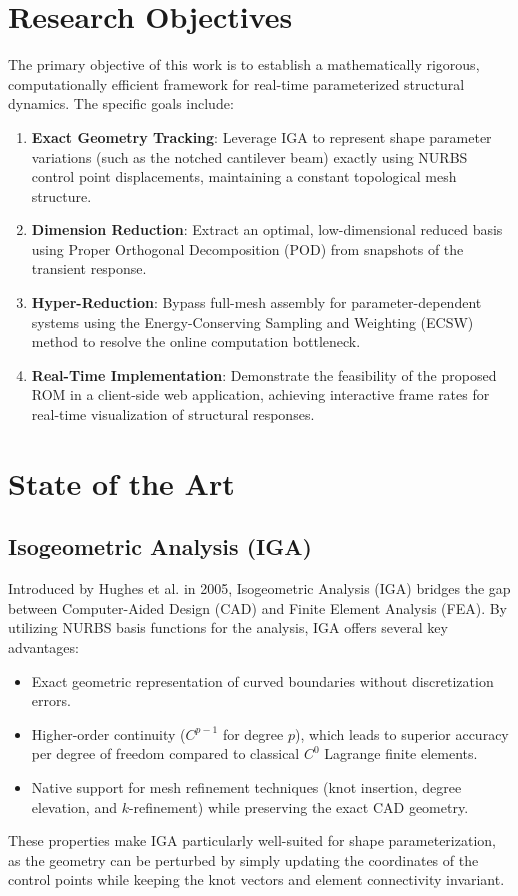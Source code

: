 \section{Research Objectives}
The primary objective of this work is to establish a mathematically rigorous, computationally efficient framework for real-time parameterized structural dynamics. The specific goals include:
\begin{enumerate}
    \item \textbf{Exact Geometry Tracking}: Leverage IGA to represent shape parameter variations (such as the notched cantilever beam) exactly using NURBS control point displacements, maintaining a constant topological mesh structure.
    \item \textbf{Dimension Reduction}: Extract an optimal, low-dimensional reduced basis using Proper Orthogonal Decomposition (POD) from snapshots of the transient response.
    \item \textbf{Hyper-Reduction}: Bypass full-mesh assembly for parameter-dependent systems using the Energy-Conserving Sampling and Weighting (ECSW) method to resolve the online computation bottleneck.
    \item \textbf{Real-Time Implementation}: Demonstrate the feasibility of the proposed ROM in a client-side web application, achieving interactive frame rates for real-time visualization of structural responses.
\end{enumerate}

\section{State of the Art}
\subsection{Isogeometric Analysis (IGA)}
Introduced by Hughes et al. in 2005, Isogeometric Analysis (IGA) bridges the gap between Computer-Aided Design (CAD) and Finite Element Analysis (FEA). By utilizing NURBS basis functions for the analysis, IGA offers several key advantages:
\begin{itemize}
    \item Exact geometric representation of curved boundaries without discretization errors.
    \item Higher-order continuity ($C^{p-1}$ for degree $p$), which leads to superior accuracy per degree of freedom compared to classical $C^0$ Lagrange finite elements.
    \item Native support for mesh refinement techniques (knot insertion, degree elevation, and $k$-refinement) while preserving the exact CAD geometry.
\end{itemize}
These properties make IGA particularly well-suited for shape parameterization, as the geometry can be perturbed by simply updating the coordinates of the control points while keeping the knot vectors and element connectivity invariant.

